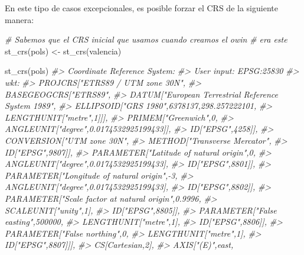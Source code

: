 \documentclass[
]{book}
\newenvironment{Shaded}{\begin{snugshade}}{\end{snugshade}}
\newcommand{\CommentTok}[1]{\textcolor[rgb]{0.56,0.35,0.01}{\textit{#1}}}
\newcommand{\FunctionTok}[1]{\textcolor[rgb]{0.00,0.00,0.00}{#1}}
\newcommand{\NormalTok}[1]{#1}
\newcommand{\OtherTok}[1]{\textcolor[rgb]{0.56,0.35,0.01}{#1}}
\theoremstyle{definition}
\theoremstyle{definition}
\theoremstyle{definition}
\theoremstyle{definition}
\theoremstyle{remark}
\begin{document}
En este tipo de casos excepcionales, es posible forzar el CRS de la siguiente
manera:

\begin{Shaded}
\begin{Highlighting}[]
\CommentTok{\# Sabemos que el CRS inicial que usamos cuando creamos el owin}
\CommentTok{\# era este}
\FunctionTok{st\_crs}\NormalTok{(pols) }\OtherTok{\textless{}{-}} \FunctionTok{st\_crs}\NormalTok{(valencia)}

\FunctionTok{st\_crs}\NormalTok{(pols)}
\CommentTok{\#\textgreater{} Coordinate Reference System:}
\CommentTok{\#\textgreater{}   User input: EPSG:25830 }
\CommentTok{\#\textgreater{}   wkt:}
\CommentTok{\#\textgreater{} PROJCRS["ETRS89 / UTM zone 30N",}
\CommentTok{\#\textgreater{}     BASEGEOGCRS["ETRS89",}
\CommentTok{\#\textgreater{}         DATUM["European Terrestrial Reference System 1989",}
\CommentTok{\#\textgreater{}             ELLIPSOID["GRS 1980",6378137,298.257222101,}
\CommentTok{\#\textgreater{}                 LENGTHUNIT["metre",1]]],}
\CommentTok{\#\textgreater{}         PRIMEM["Greenwich",0,}
\CommentTok{\#\textgreater{}             ANGLEUNIT["degree",0.0174532925199433]],}
\CommentTok{\#\textgreater{}         ID["EPSG",4258]],}
\CommentTok{\#\textgreater{}     CONVERSION["UTM zone 30N",}
\CommentTok{\#\textgreater{}         METHOD["Transverse Mercator",}
\CommentTok{\#\textgreater{}             ID["EPSG",9807]],}
\CommentTok{\#\textgreater{}         PARAMETER["Latitude of natural origin",0,}
\CommentTok{\#\textgreater{}             ANGLEUNIT["degree",0.0174532925199433],}
\CommentTok{\#\textgreater{}             ID["EPSG",8801]],}
\CommentTok{\#\textgreater{}         PARAMETER["Longitude of natural origin",{-}3,}
\CommentTok{\#\textgreater{}             ANGLEUNIT["degree",0.0174532925199433],}
\CommentTok{\#\textgreater{}             ID["EPSG",8802]],}
\CommentTok{\#\textgreater{}         PARAMETER["Scale factor at natural origin",0.9996,}
\CommentTok{\#\textgreater{}             SCALEUNIT["unity",1],}
\CommentTok{\#\textgreater{}             ID["EPSG",8805]],}
\CommentTok{\#\textgreater{}         PARAMETER["False easting",500000,}
\CommentTok{\#\textgreater{}             LENGTHUNIT["metre",1],}
\CommentTok{\#\textgreater{}             ID["EPSG",8806]],}
\CommentTok{\#\textgreater{}         PARAMETER["False northing",0,}
\CommentTok{\#\textgreater{}             LENGTHUNIT["metre",1],}
\CommentTok{\#\textgreater{}             ID["EPSG",8807]]],}
\CommentTok{\#\textgreater{}     CS[Cartesian,2],}
\CommentTok{\#\textgreater{}         AXIS["(E)",east,}

\end{Highlighting}
\end{Shaded}
\end{document}
